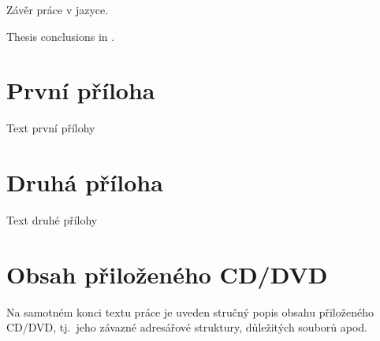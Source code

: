 \documentclass[
  field=inf,
  biblatex,
  language=english,
  glossaries,
  index
]{kidiplom}
\begin{document}
\begin{kiconclusions}
Závěr práce v  jazyce.
\end{kiconclusions}

\begin{kiconclusions}[english]
Thesis conclusions in .
\end{kiconclusions}

\appendix

\section{První příloha}
Text první přílohy

\section{Druhá příloha}
Text druhé přílohy

\section{Obsah přiloženého CD/DVD} \label{sec:ObsahCD}

Na samotném konci textu práce je uveden stručný popis obsahu
přiloženého CD/DVD, tj.~jeho závazné adresářové struktury, důležitých
souborů apod.
\end{document}
